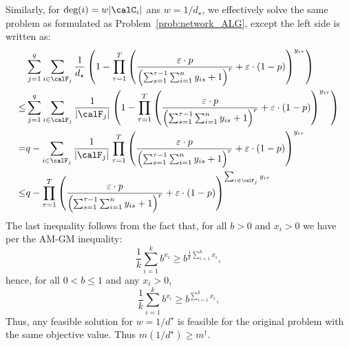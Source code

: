\documentclass[blindrev]{informs3noheader}
\begin{document}
Similarly, for $\text{deg}(i)=w|\calC_i|$ ans $w=1/d_\star$, we effectively solve the same problem as formulated as Problem~\eqref{prob:network_ALG}, except the left side is written as:
\begin{align*}
&\sum_{j=1}^q \sum_{i \in \calF_j} \frac{1}{d_\star}\left(1-\prod_{\tau=1}^T \left(\frac{\varepsilon\cdot p }{\left(\sum_{s=1}^{\tau-1} \sum_{i=1}^n y_{is} +1\right)^r}+\varepsilon\cdot(1-p)\right)^{y_{i\tau}}\right)
\\\leq &\sum_{j=1}^q \sum_{i \in \calF_j} \frac{1}{|\calF_j|}\left(1-\prod_{\tau=1}^T \left(\frac{\varepsilon\cdot p }{\left(\sum_{s=1}^{\tau-1} \sum_{i=1}^n y_{is} +1\right)^r}+\varepsilon\cdot(1-p)\right)^{y_{i\tau}}\right)
 \\ =&q-\sum_{i \in \calF_j} \frac{1}{|\calF_j|}\prod_{\tau=1}^T \left(\frac{\varepsilon\cdot p }{\left(\sum_{s=1}^{\tau-1} \sum_{i=1}^n y_{is} +1\right)^r}+\varepsilon\cdot(1-p)\right)^{y_{i\tau}}
  \\ \leq &q-\prod_{\tau=1}^T \left(\frac{\varepsilon\cdot p }{\left(\sum_{s=1}^{\tau-1} \sum_{i=1}^n y_{is} +1\right)^r}+\varepsilon\cdot(1-p)\right)^{\sum_{i \in \calF_j} y_{i\tau}}    
\end{align*}
The last inequality follows from the fact that, for all $b>0$ and $x_i>0$ we have per the AM-GM inequality:
\[\frac{1}{k} \sum_{i=1}^k b^{x_i} \geq b^{\frac{1}{k}\sum_{i=1}^k x_i},\]
hence, for all $0<b\leq 1$ and any $x_i>0$,
\[\frac{1}{k} \sum_{i=1}^k b^{x_i} \geq b^{\sum_{i=1}^k x_i},\]
Thus, any feasible solution for $w=1/d^\star$ is feasible for the original problem with the same objective value. Thus $m(1/d^\star)\geq m^\dagger$.
\end{document}
